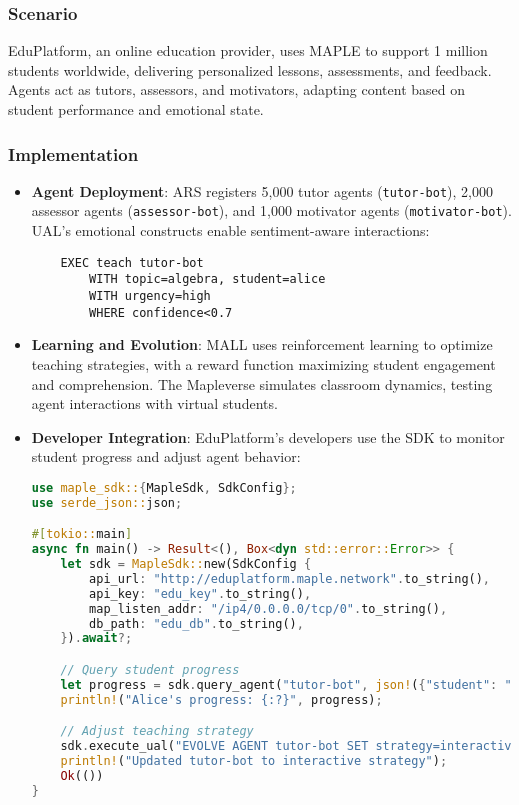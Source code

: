 \documentclass[a4paper,11pt]{article}
\begin{document}
\subsubsection{Scenario}
EduPlatform, an online education provider, uses MAPLE to support 1 million students worldwide, delivering personalized lessons, assessments, and feedback. Agents act as tutors, assessors, and motivators, adapting content based on student performance and emotional state.

\subsubsection{Implementation}
\begin{itemize}[leftmargin=*]
    \item \textbf{Agent Deployment}: ARS registers 5,000 tutor agents (\texttt{tutor-bot}), 2,000 assessor agents (\texttt{assessor-bot}), and 1,000 motivator agents (\texttt{motivator-bot}). UAL’s emotional constructs enable sentiment-aware interactions:
    \begin{verbatim}
    EXEC teach tutor-bot
        WITH topic=algebra, student=alice
        WITH urgency=high
        WHERE confidence<0.7
    \end{verbatim}
    \item \textbf{Learning and Evolution}: MALL uses reinforcement learning to optimize teaching strategies, with a reward function maximizing student engagement and comprehension. The Mapleverse simulates classroom dynamics, testing agent interactions with virtual students.
    \item \textbf{Developer Integration}: EduPlatform’s developers use the SDK to monitor student progress and adjust agent behavior:
    \begin{lstlisting}[language=Rust, caption={Rust SDK for Education}, label={lst:education}]
use maple_sdk::{MapleSdk, SdkConfig};
use serde_json::json;

#[tokio::main]
async fn main() -> Result<(), Box<dyn std::error::Error>> {
    let sdk = MapleSdk::new(SdkConfig {
        api_url: "http://eduplatform.maple.network".to_string(),
        api_key: "edu_key".to_string(),
        map_listen_addr: "/ip4/0.0.0.0/tcp/0".to_string(),
        db_path: "edu_db".to_string(),
    }).await?;

    // Query student progress
    let progress = sdk.query_agent("tutor-bot", json!({"student": "alice"})).await?;
    println!("Alice's progress: {:?}", progress);

    // Adjust teaching strategy
    sdk.execute_ual("EVOLVE AGENT tutor-bot SET strategy=interactive").await?;
    println!("Updated tutor-bot to interactive strategy");
    Ok(())
}
    \end{lstlisting}
\end{itemize}
\end{document}
